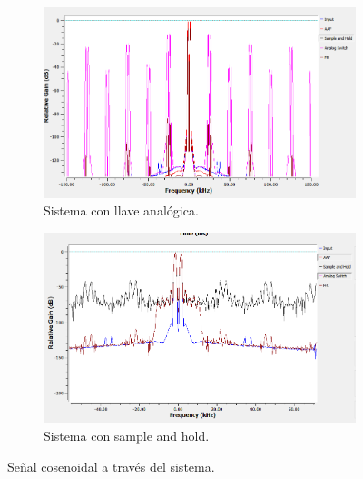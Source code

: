 \begin{figure}[H]
	\begin{subfigure}{.5\textwidth}
	\centering
	\includegraphics[width=\textwidth]{SimulacionesGNURADIO/Condiciones_optimas/COSENO_FFT_LLAVE_BC.PNG}
	\caption{Sistema con llave analógica.}
	\end{subfigure}
	\begin{subfigure}{.5\textwidth}
	\centering
	\includegraphics[width=\textwidth]{SimulacionesGNURADIO/Condiciones_optimas/COSENO_FFT_SAMPLE_AND_HOLD_BC.PNG}
	\caption{Sistema con sample and hold.}	
	\end{subfigure}
	\caption{Señal cosenoidal a través del sistema.}
\end{figure}


